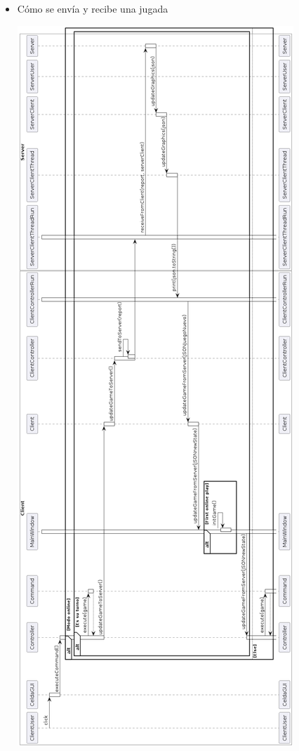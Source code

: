 \documentclass[../DocumentoOficial.tex]{subfiles}
\begin{document}
\begin{sprint}[5]
\begin{itemize}
\item Cómo se envía y recibe una jugada

\begin{center}
\includegraphics[scale=0.42]{juegoTipicoUmlSprint5.png} 
\end{center}

\end{itemize}

\end{sprint}
\end{document}
